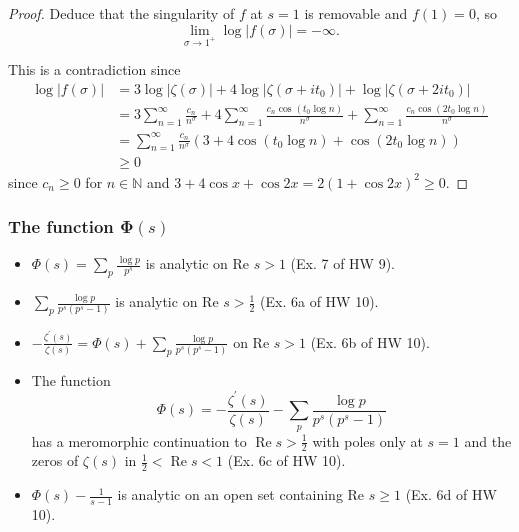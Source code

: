 \documentclass[12pt]{article}
\begin{document}
\begin{itemize}
\begin{proof}
Deduce that the singularity of \(f\) at \(s=1\) is removable and
\(f(1)=0\), so \[
\lim _{\sigma \rightarrow 1^{+}} \log |f(\sigma)|=-\infty .
\]

This is a contradiction since \[
\begin{aligned}
\log |f(\sigma)| & =3 \log |\zeta(\sigma)|+4 \log \left|\zeta\left(\sigma+i t_0\right)\right|+\log \left|\zeta\left(\sigma+2 i t_0\right)\right| \\
& =3 \sum_{n=1}^{\infty} \frac{c_n}{n^\sigma}+4 \sum_{n=1}^{\infty} \frac{c_n \cos \left(t_0 \log n\right)}{n^\sigma}+\sum_{n=1}^{\infty} \frac{c_n \cos \left(2 t_0 \log n\right)}{n^\sigma} \\
& =\sum_{n=1}^{\infty} \frac{c_n}{n^\sigma}\left(3+4 \cos \left(t_0 \log n\right)+\cos \left(2 t_0 \log n\right)\right) \\
& \geq 0
\end{aligned}
\] since \(c_n \geq 0\) for \(n \in \mathbb{N}\) and
\(3+4 \cos x+\cos 2 x=2(1+\cos 2 x)^2 \geq 0\).
  \end{proof}
    \end{itemize}

\subsubsection{The function Φ$(s)$}
\begin{itemize}
    \item
      \(\Phi(s)=\sum_p \frac{\log p}{p^s}\) is analytic on Re \(s>1\) (Ex. 7
      of HW 9).
    \item
      \(\sum_p \frac{\log p}{p^s\left(p^s-1\right)}\) is analytic on Re
      \(s>\frac{1}{2}\) (Ex. 6a of HW 10).
    \item
      \(-\frac{\zeta^{\prime}(s)}{\zeta(s)}=\Phi(s)+\sum_p \frac{\log p}{p^s\left(p^s-1\right)}\)
      on Re \(s>1\) (Ex. 6b of HW 10).
    \item
      The function \[
      \Phi(s)=-\frac{\zeta^{\prime}(s)}{\zeta(s)}-\sum_p \frac{\log p}{p^s\left(p^s-1\right)}
      \] has a meromorphic continuation to
      \(\operatorname{Re} s>\frac{1}{2}\) with poles only at \(s=1\) and the
      zeros of \(\zeta(s)\) in \(\frac{1}{2}<\operatorname{Re} s<1\) (Ex. 6c
      of HW 10).
    \item
      \(\Phi(s)-\frac{1}{s-1}\) is analytic on an open set containing Re
      \(s \geq 1\) (Ex. 6d of HW 10).
    \end{itemize}
\end{document}
